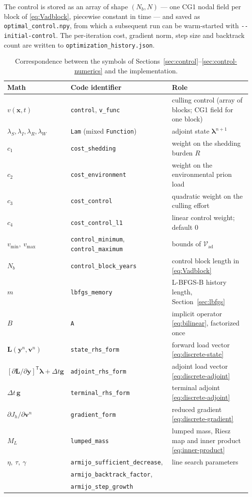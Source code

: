 \documentclass[11pt]{article}
\newcommand{\Vad}{\mathcal{V}_{\mathrm{ad}}}
\begin{document}
The control is stored as an array of shape $(N_b, N)$ --- one CG1 nodal field per block of \eqref{eq:Vadblock}, piecewise constant in time --- and saved as \texttt{optimal\_control.npy}, from which a subsequent run can be warm-started with \texttt{-{}-initial-control}. The per-iteration cost, gradient norm, step size and backtrack count are written to \texttt{optimization\_history.json}.

\begin{table}[h]
\centering
\small
\caption{Correspondence between the symbols of Sections~\ref{sec:control}--\ref{sec:control-numerics} and the implementation.}
\label{tab:control-notation}
\begin{tabular}{@{}lll@{}}
\toprule
Math & Code identifier & Role \\
\midrule
$v(\mathbf{x},t)$ & \texttt{control}, \texttt{v\_func} & culling control (array of blocks; CG1 field for one block) \\
$\lambda_S,\lambda_I,\lambda_R,\lambda_W$ & \texttt{Lam} (mixed \texttt{Function}) & adjoint state $\boldsymbol\lambda^{n+1}$ \\
$c_1$ & \texttt{cost\_shedding} & weight on the shedding burden $R$ \\
$c_2$ & \texttt{cost\_environment} & weight on the environmental prion load \\
$c_3$ & \texttt{cost\_control} & quadratic weight on the culling effort \\
$c_4$ & \texttt{cost\_control\_l1} & linear control weight; default $0$ \\
$v_{\min},\ v_{\max}$ & \texttt{control\_minimum}, \texttt{control\_maximum} & bounds of $\Vad$ \\
$N_b$ & \texttt{control\_block\_years} & control block length in \eqref{eq:Vadblock} \\
$m$ & \texttt{lbfgs\_memory} & L-BFGS-B history length, Section~\ref{sec:lbfgs} \\
$B$ & \texttt{A} & implicit operator \eqref{eq:bilinear}, factorized once \\
$\mathbf{L}(\mathbf{y}^n,\mathbf{v}^n)$ & \texttt{state\_rhs\_form} & forward load vector \eqref{eq:discrete-state} \\
$[\partial\mathbf{L}/\partial\mathbf{y}]^{\mathsf T}\boldsymbol\lambda + \Delta t\mathbf{g}$ & \texttt{adjoint\_rhs\_form} & adjoint load vector \eqref{eq:discrete-adjoint} \\
$\Delta t\,\mathbf{g}$ & \texttt{terminal\_rhs\_form} & terminal adjoint \eqref{eq:discrete-adjoint} \\
$\partial J_h/\partial\mathbf{v}^n$ & \texttt{gradient\_form} & reduced gradient \eqref{eq:discrete-gradient} \\
$M_L$ & \texttt{lumped\_mass} & lumped mass, Riesz map and inner product \eqref{eq:inner-product} \\
$\eta,\ \tau,\ \gamma$ & \texttt{armijo\_sufficient\_decrease}, & line search parameters \\
 & \texttt{armijo\_backtrack\_factor}, & \\
 & \texttt{armijo\_step\_growth} & \\
\bottomrule
\end{tabular}
\end{table}
\end{document}
